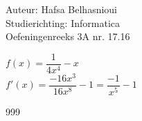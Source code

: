 \documentclass[a4paper]{article}
\begin{document}
\noindent \large Auteur: Hafsa Belhasnioui \\
\noindent \large Studierichting: Informatica\\
\noindent \large Oefeningenreeks 3A nr. 17.16\\

\medskip

\normalsize

$f(x) = \dfrac{1}{4x^4} - x$\\

$f'(x) = \dfrac{-16x^3}{16x^8} - 1 = \dfrac{-1}{x^5} - 1$\\



\begin{thebibliography}{999}
\end{thebibliography}
\end{document}

